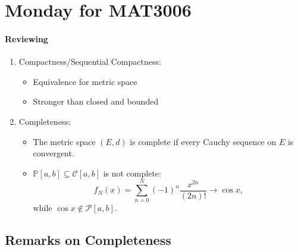 \section{Monday for MAT3006}
\paragraph{Reviewing}
\begin{enumerate}
\item
Compactness/Sequential Compactness:
\begin{itemize}
\item
Equivalence for metric space
\item
Stronger than closed and bounded
\end{itemize}
\item
Completeness: 
\begin{itemize}
\item
The metric space $(E,d)$ is complete if every Cauchy sequence on $E$ is convergent.
\item
$\mathbb{P}[a,b]\subseteq\mathcal{C}[a,b]$ is not complete:
\[
f_N(x)=\sum_{n=0}^N(-1)^n\frac{x^{2n}}{(2n)!}\to\cos x,
\]
while $\cos x\notin\mathcal{P}[a,b]$.
\end{itemize}
\end{enumerate}


\subsection{Remarks on Completeness}

